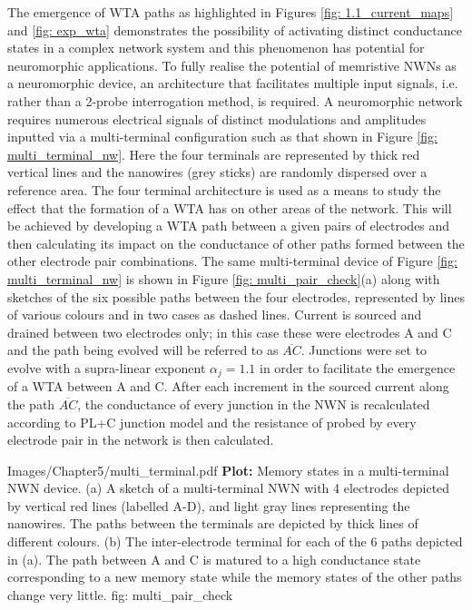 The emergence of WTA paths as highlighted in Figures \ref{fig: 1.1_current_maps} and \ref{fig: exp_wta} demonstrates the possibility of activating distinct conductance states in a complex network system and this phenomenon has potential for neuromorphic applications. To fully realise the potential of memristive NWNs as a neuromorphic device, an architecture that facilitates multiple input signals, i.e. rather than a 2-probe interrogation method, is required. A neuromorphic network requires numerous electrical signals of distinct modulations and amplitudes inputted via a multi-terminal configuration such as that shown in Figure \ref{fig: multi_terminal_nw}. Here the four terminals are represented by thick red vertical lines and the nanowires (grey sticks) are randomly dispersed over a reference area. The four terminal architecture is used as a means to study the effect that the formation of a WTA has on other areas of the network. This will be achieved by developing a WTA path between a given pairs of electrodes and then calculating its impact on the conductance of other paths formed between the other electrode pair combinations. The same multi-terminal device of Figure \ref{fig: multi_terminal_nw} is shown in Figure \ref{fig: multi_pair_check}(a) along with sketches of the six possible paths between the four electrodes, represented by lines of various colours and in two cases as dashed lines. Current is sourced and drained between two electrodes only; in this case these were electrodes A and C and the path being evolved will be referred to as $\overline{AC}$. Junctions were set to evolve with a supra-linear exponent $\alpha_j = 1.1$ in order to facilitate the emergence of a WTA between A and C. After each increment in the sourced current along the path $\overline{AC}$, the conductance of every junction in the NWN is recalculated according to PL+C junction model and the resistance of probed by every electrode pair in the network is then calculated. 

{Images/Chapter5/multi_terminal.pdf}
{\textbf{Plot:} Memory states in a multi-terminal NWN device.} 
{(a) A sketch of a multi-terminal NWN with 4 electrodes depicted by vertical red lines (labelled A-D), and light gray lines representing the nanowires. The paths between the terminals are depicted by thick lines of different colours. (b) The inter-electrode terminal for each of the 6 paths depicted in (a). The path between A and C is matured to a high conductance state corresponding to a new memory state while the memory states of the other paths change very little.}
{fig: multi_pair_check}

